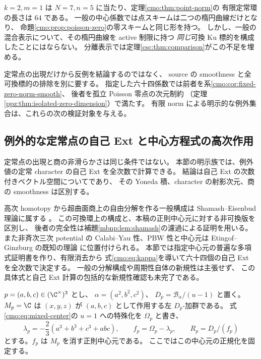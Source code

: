 \begin{remark}[可換 Ku 実現と点スキーム比較との関係]
\label{cmo:rem:scope}
$k=2,m=1$ は $N=7,n=5$ に当たり、定理\ref{cmo:thm:point-norm}の
有限定常環の長さは $64$ である。
一般の中心係数では点スキームは二つの楕円曲線だけとなり、
命題\ref{cmo:prop:poisson-zero}の零スキームと同じ形を持つ。
しかし、一般の混合表示について、その楕円曲線を active 制限に持つ
\emph{同じ}可換 Ku 標的を構成したことにはならない。
分離表示では定理\ref{csc:thm:comparison}がこの不足を埋める。

定常点の出現だけから反例を結論するのではなく、
source の smoothness と全可換標的の排除を別に要する。
指定した六十四係数では前者を系\ref{cmo:cor:fixed-zero-norm-smooth}、
後者を孤立 Poisson 零点の次元制約
（定理\ref{ppz:thm:isolated-zero-dimension}）で満たす。
有限 norm による明示的な例外集合は、これらの次の検証対象を与える。
\end{remark}

\subsection{例外的な定常点の自己 Ext と中心方程式の高次作用}
\label{cmo:subsec:character-ext}

定常点の出現と商の非滑らかさは同じ条件ではない。
本節の明示族では、例外値の定常 character の自己 Ext を全次数で計算できる。
結論は自己 Ext の次数付きベクトル空間についてであり、
その Yoneda 積、character の射影次元、商の smoothness は区別する。

高次 homotopy から超曲面商上の自由分解を作る一般構成は
Shamash--Eisenbud 理論に属する
\cite[Theorem~7.2]{NFMEisenbudCI}。
この可換環上の構成と、本稿の正則中心元に対する非可換版を区別し、
後者の完全性は補題\ref{mbnp:lem:shamash}の濾過による証明を用いる。
また非斉次三次 potential の Calabi--Yau 性、PBW 性と中心元は
Etingof--Ginzburg の既知の理論
\cite[Theorem~3.3.2, Sections~3.4,~8.3]{NFMEG}に位置付けられる。
本節では指定中心元の普遍な多項式証明書を作り、有限消去から
式\eqref{cmo:eq:kappa}を導いて六十四個の自己 Ext を全次数で決定する。
一般の分解構成や周期性自体の新規性は主張せず、
この具体式と自己 Ext 計算の包括的な新規性確認も未完了である。

$p=(a,b,c)\in(\C^\times)^3$ とし、
$\alpha=(a^2,b^2,c^2)$、
$D_p=\mathcal B_\alpha/(u-1)$ と置く。
$M_p=\C$ は $(x,y,z)$ が $(a,b,c)$ として作用する左 $D_p$-加群である。
式\eqref{cmo:eq:mixed-center}の $u=1$ への特殊化を $\Omega_p$ と書き、
\begin{equation}\label{cmo:eq:character-value}
 \lambda_p=-\frac23(a^3+b^3+c^3+abc),\qquad
 f_p=\Omega_p-\lambda_p,\qquad R_p=D_p/(f_p)
\end{equation}
とする。$f_p$ は $M_p$ を消す正則中心元である。
ここではこの中心元の正規化を固定する。


